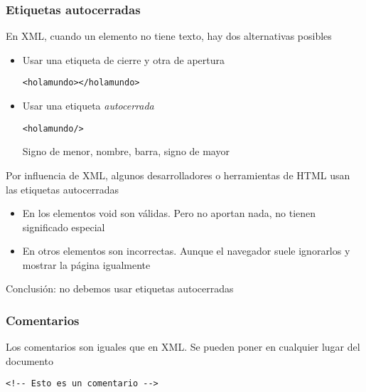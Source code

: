 \documentclass[ucs]{beamer}
\begin{document}
\begin{frame}[fragile]
\frametitle{Etiquetas autocerradas}
En XML, cuando un elemento no tiene texto, hay dos alternativas posibles
\begin{itemize}
\item
Usar una etiqueta de cierre y otra de apertura

  \begin{footnotesize}
  \begin{verbatim}
<holamundo></holamundo>
  \end{verbatim}
  \end{footnotesize}
\item
Usar una etiqueta \emph{autocerrada}
  \begin{footnotesize}
  \begin{verbatim}
<holamundo/>
  \end{verbatim}
  \end{footnotesize}Signo de menor, nombre, barra, signo de mayor
\end{itemize}


Por influencia de XML, algunos desarrolladores o herramientas de HTML usan las etiquetas
autocerradas

    \begin{itemize}
    \item
En los elementos void son válidas. Pero no aportan nada, no tienen significado especial
    \item
En otros elementos son incorrectas. Aunque el navegador suele ignorarlos y mostrar la página igualmente
    \end{itemize}

Conclusión: no debemos usar etiquetas autocerradas


\end{frame}

\begin{frame}[fragile,]
\frametitle{Comentarios}

Los comentarios son iguales que en XML. Se pueden poner en cualquier lugar del documento
  \begin{footnotesize}
  \begin{verbatim}
<!-- Esto es un comentario -->
  \end{verbatim}
  \end{footnotesize}

\end{frame}
\end{document}
